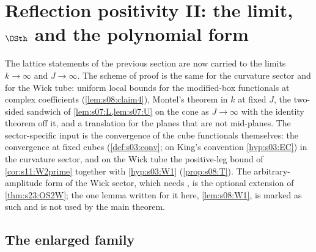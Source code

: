 \section{Reflection positivity II: the limit, \texorpdfstring{$\OSth$}{OS3} and the polynomial form}

The lattice statements of the previous section are now carried to the limits $k\to\infty$ and $J\to\infty$. The scheme of proof is the same for the curvature sector and for the Wick tube: uniform local bounds for the modified-box functionals at complex coefficients (\cref{lem:s08:claim4}), Montel's theorem in $k$ at fixed $J$, the two-sided sandwich of \cref{lem:s07:L,lem:s07:U} on the cone as $J\to\infty$ with the identity theorem off it, and a translation for the planes that are not mid-planes. The sector-specific input is the convergence of the cube functionals themselves: the convergence at fixed cubes (\cref{def:s03:conv}; on King's convention \cref{hyp:s03:EC}) in the curvature sector, and on the Wick tube the positive-leg bound of \cref{cor:s11:W2prime} together with \cref{hyp:s03:W1} (\cref{prop:s08:T}). The arbitrary-amplitude form of the Wick sector, which needs \Wtwo, is the optional extension of \cref{thm:s23:OS2W}; the one lemma written for it here, \cref{lem:s08:W1}, is marked as such and is not used by the main theorem.

\subsection{The enlarged family}


